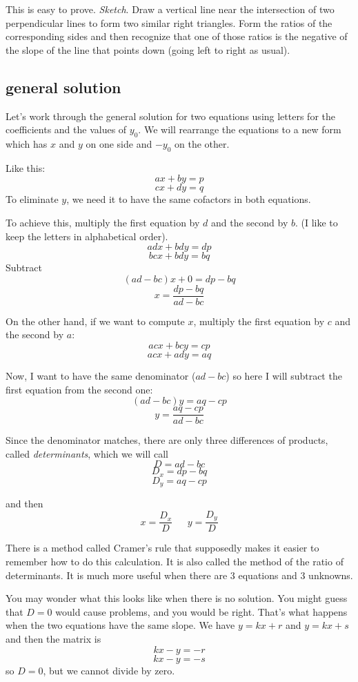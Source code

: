 \documentclass[11pt, oneside]{article}
\begin{document}
This is easy to prove.  \emph{Sketch}.  Draw a vertical line near the intersection of two perpendicular lines to form two similar right triangles.  Form the ratios of the corresponding sides and then recognize that one of those ratios is the negative of the slope of the line that points down (going left to right as usual).

\subsection*{general solution}
Let's work through the general solution for two equations using letters for the coefficients and the values of $y_0$.  We will rearrange the equations to a new form which has $x$ and $y$ on one side and $-y_0$ on the other.

Like this:
\[ ax + by = p \]
\[ cx + dy = q \]
To eliminate $y$, we need it to have the same cofactors in both equations.

To achieve this, multiply the first equation by $d$ and the second by $b$.  (I like to keep the letters in alphabetical order).
\[ adx + bdy = dp \]
\[ bcx + bdy = bq \]
Subtract
\[ (ad - bc)x  + 0 = dp - bq \]
\[ x = \frac{dp - bq}{ad - bc} \]

On the other hand, if we want to compute $x$, multiply the first equation by $c$ and the second by $a$:
\[ acx + bcy = cp \]
\[ acx + ady = aq \]

Now, I want to have the same denominator ($ad - bc$) so here I will subtract the first equation from the second one:
\[ (ad - bc)y = aq - cp \]
\[ y = \frac{aq - cp}{ad - bc} \]

Since the denominator matches, there are only three differences of products, called \emph{determinants}, which we will call
\[ D = ad - bc \]
\[ D_x = dp - bq \]
\[ D_y = aq - cp \]

and then
\[ x = \frac{D_x}{D} \ \ \ \ \ \ \ y = \frac{D_y}{D} \]

There is a method called Cramer's rule that supposedly makes it easier to remember how to do this calculation.  It is also called the method of the ratio of determinants.  It is much more useful when there are 3 equations and 3 unknowns.

You may wonder what this looks like when there is no solution.  You might guess that $D = 0$ would cause problems, and you would be right.  That's what happens when the two equations have the same slope.  We have $y = kx + r$ and $y = kx + s$ and then the matrix is
\[ kx - y = -r \]
\[ kx - y = -s \]
so $D = 0$, but we cannot divide by zero.
\end{document}
